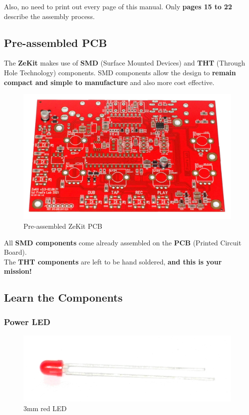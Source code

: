 \documentclass{scrartcl}
\begin{document}
Also, no need to print out every page of this manual. Only \textbf{pages 15 to 22} describe the assembly process.

\pagebreak
\subsection{Pre-assembled PCB}

The \textbf{ZeKit} makes use of \textbf{SMD} (Surface Mounted Devices) and \textbf{THT} (Through Hole Technology) components. SMD components allow the design to \textbf{remain compact and simple to manufacture} and also more cost effective.

\begin{figure}[!ht]
    \begin{center}
        \includegraphics[scale=0.10]{assets/zekit-unassembled.jpg}
        \caption{Pre-assembled ZeKit PCB}
    \end{center}
\end{figure}

All \textbf{SMD components} come already assembled on the \textbf{PCB} (Printed Circuit Board). \\
The \textbf{THT components} are left to be hand soldered, \textbf{and this is your mission!}

\subsection{Learn the Components}

\subsubsection{Power LED}

\begin{figure}[!ht]
    \begin{center}
        \includegraphics[scale=0.15]{assets/zekit-led.jpg}
        \caption{3mm red LED}
    \end{center}
\end{figure}
\end{document}
